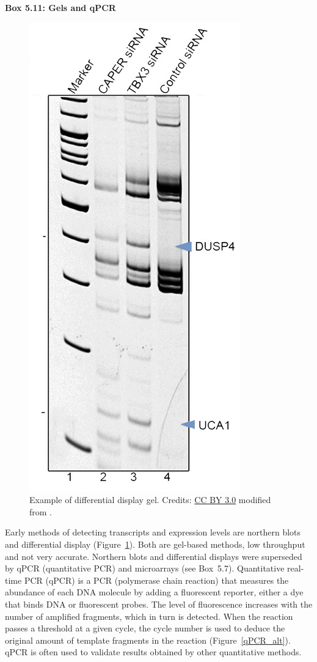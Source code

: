\begin{framed}
\textbf{Box 5.11: Gels and qPCR}\\
\begin{figure}[!htbp]
\centering
\includegraphics[width=0.23\linewidth]{files/differential-gel_alt-71930b59285dc178cf571ccbfbb991dd.png}
\caption[]{Example of differential \newline
display gel. Credits: \href{https://creativecommons.org/licenses/by/3.0/}{CC BY 3.0} \newline
modified from \newline
\cite{differential_gel_alt_2014}.}
\label{differential_gel_alt}
\end{figure}

Early methods of detecting transcripts and expression levels are northern
blots and differential display (Figure~\ref{differential_gel_alt}).  Both are
gel-based methods, low throughput and not very accurate.  Northern blots and
differential displays were superseded by qPCR (quantitative PCR) and
microarrays (see Box~5.7).  Quantitative real-time PCR
(qPCR) is a PCR (polymerase chain reaction) that measures the abundance of
each DNA molecule by adding a fluorescent reporter, either a dye that binds
DNA or fluorescent probes.  The level of fluorescence increases with the
number of amplified fragments, which in turn is detected.  When the reaction
passes a threshold at a given cycle, the cycle number is used to deduce the
original amount of template fragments in the reaction (Figure~\ref{qPCR_alt}).
qPCR is often used to validate results obtained by other quantitative
methods.


\end{framed}
